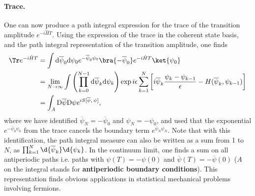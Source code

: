 \paragraph{Trace.}
One can now produce a path integral expression for the trace of the transition amplitude \(e^{-i\hat{H}T}\). Using the expression of the trace in the coherent state basis, and the path integral representation of the transition amplitude, one finds
\[
    \begin{aligned}
        \Tr e^{-i \hat{H} T} & = \int \mathrm{d} \overline{\psi}_0 \mathrm{d} \psi_0 e^{-\overline{\psi}_0 \psi_0} \bra{-\overline{\psi}_0} e^{-i \hat{H} T} \ket{\psi_0}                                                                                                             \\
                             & = \lim_{N \to \infty} \int \left( \prod_{k=0}^{N-1} \mathrm{d} \overline{\psi}_k \mathrm{d} \psi_k \right) \exp{ i \epsilon \sum_{k=1}^{N} \left[ i \overline{\psi}_k \frac{\psi_k - \psi_{k-1}}{\epsilon} - H(\overline{\psi}_k, \psi_{k-1}) \right]} \\
                             & = \int_A \mathrm{D} \overline{\psi} \mathrm{D} \psi e^{i S[\overline{\psi},\,\psi]},
    \end{aligned}
\]
where we have identified \(\overline{\psi}_N = -\overline{\psi}_0\) and \(\psi_N = -\psi_0\), and used that the exponential \(e^{-\overline{\psi}_0 \psi_0}\) from the trace cancels the boundary term \(e^{\overline{\psi}_N \psi_N}\). Note that with this identification, the path integral measure can also be written as a sum from 1 to \(N\), as \(\prod_{k=1}^{N} \d{\overline{\psi}_k} \d{\psi_k}\). In the continuum limit, one finds a sum on all antiperiodic paths i.e. paths with \(\psi(T) = - \psi(0)\) and \(\overline{\psi}(T) = - \overline{\psi}(0)\) (\(A\) on the integral stands for \textbf{antiperiodic boundary conditions}). This representation finds obvious applications in statistical mechanical problems involving fermions.

